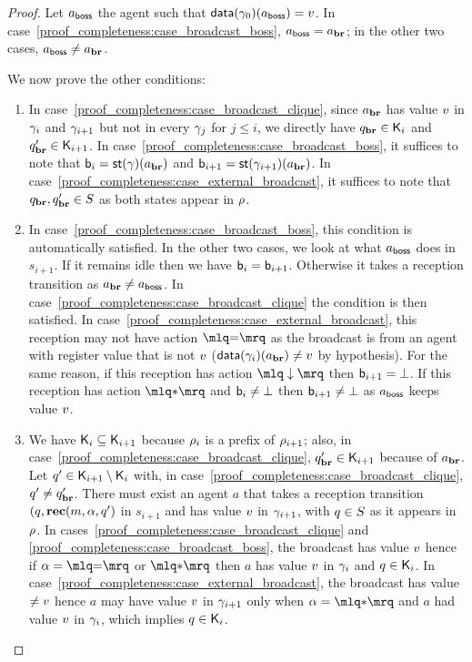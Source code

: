 \begin{proof}
	Let $a_{\mathsf{boss}}$ the agent such that $\mathsf{data}(\gamma_0)(a_{\mathsf{boss}}) = v$. In case~\ref{proof_completeness:case_broadcast_boss}, $a_{\mathsf{boss}} = a_{\textbf{br}}$; in the other two cases, $a_{\mathsf{boss}} \ne a_{\textbf{br}}$. 
	
	We now prove the other conditions:
	\begin{enumerate}[label = (\arabic*)]
		\item In case~\ref{proof_completeness:case_broadcast_clique}, since $a_{\textbf{br}}$ has value $v$ in $\gamma_i$ and $\gamma_{i+1}$ but not in every $\gamma_j$ for $j \leq i$, we directly have $q_{\textbf{br}} \in \mathsf{K}_i$ and $q_{\textbf{br}}' \in \mathsf{K}_{i+1}$. In case~\ref{proof_completeness:case_broadcast_boss}, it suffices to note that $\mathsf{b}_i = \mathsf{st}(\gamma)(a_{\textbf{br}})$ and $\mathsf{b}_{i+1} = \mathsf{st}(\gamma_{i+1})(a_{\textbf{br}})$. In case~\ref{proof_completeness:case_external_broadcast}, it suffices to note that $q_{\textbf{br}}, q_{\textbf{br}}' \in S$ as both states appear in $\rho$.
		
		\item In case~\ref{proof_completeness:case_broadcast_boss}, this condition is automatically satisfied. In the other two cases, we look at what $a_{\mathsf{boss}}$ does in $s_{i+1}$. If it remains idle then we have $\mathsf{b}_i = \mathsf{b}_{i+1}$. Otherwise it takes a reception transition as $a_{\textbf{br}} \ne a_{\mathsf{boss}}$. In case~\ref{proof_completeness:case_broadcast_clique} the condition is then satisfied.
		In case~\ref{proof_completeness:case_external_broadcast}, this reception may not have action $\quotemarks{\eqtestact}$ as the broadcast is from an agent with register value that is not $v$ ($\mathsf{data}(\gamma_i)(a_{\textbf{br}}) \ne v$ by hypothesis). For the same reason, if this reception has action $\quotemarks{\enregact}$ then $\mathsf{b}_{i+1}= \bot$. If this reception has action $\quotemarks{\dummyact}$ and $\mathsf{b}_i \ne \bot$ then $\mathsf{b}_{i+1} \ne \bot$ as $a_{\mathsf{boss}}$ keeps value $v$.
		
		\item We have $\mathsf{K}_i \subseteq \mathsf{K}_{i+1}$ because $\rho_{i}$ is a prefix of $\rho_{i+1}$; also, in case~\ref{proof_completeness:case_broadcast_clique}, $q_{\textbf{br}}' \in \mathsf{K}_{i+1}$ because of $a_{\textbf{br}}$. Let $q' \in \mathsf{K}_{i+1} \setminus \mathsf{K}_i$ with, in case~\ref{proof_completeness:case_broadcast_clique}, $q' \ne q_{\textbf{br}}'$. There must exist  an agent $a$ that takes a reception transition $(q, \textbf{rec}(m, \alpha, q')$ in $s_{i+1}$ and has value $v$ in $\gamma_{i+1}$, with $q\in S$ as it appears in $\rho$. In cases~\ref{proof_completeness:case_broadcast_clique} and \ref{proof_completeness:case_broadcast_boss}, the broadcast has value $v$ hence if $\anact = \quotemarks{\eqtestact}$ or $\quotemarks{\dummyact}$ then $a$ has value $v$ in $\gamma_i$ and $q \in \mathsf{K}_i$. In case~\ref{proof_completeness:case_external_broadcast}, the broadcast has value $\ne v$ hence $a$ may have value $v$ in $\gamma_{i+1}$ only when $\anact = \quotemarks{\dummyact}$ and $a$ had value $v$ in $\gamma_i$, which implies $q \in \mathsf{K}_i$. 
		

\end{enumerate}
\end{proof}
